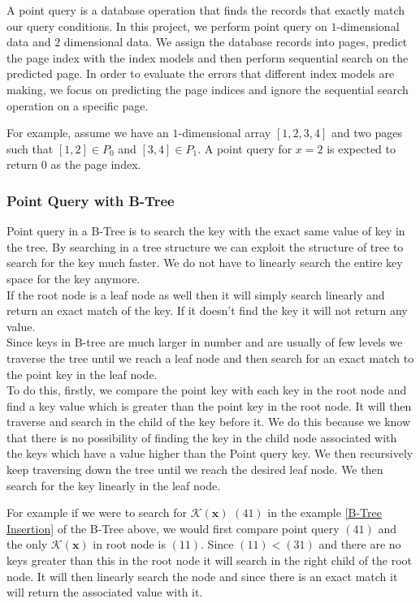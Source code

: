 A point query is a database operation that finds the records that exactly match our query conditions. In this project, we perform point query on $1$-dimensional data and $2$ dimensional data. We assign the database records into pages, predict the page index with the index models and then perform sequential search on the predicted page. In order to evaluate the errors that different index models are making, we focus on predicting the page indices and ignore the sequential search operation on a specific page. 

\begin{mscexample}
For example, assume we have an $1$-dimensional array $[1,2,3,4]$ and two pages such that $[1,2]\in P_0$ and $[3,4]\in P_1$. A point query for $x=2$ is expected to return 0 as the page index.
\end{mscexample}

\subsubsection{Point Query with B-Tree}

Point query in a B-Tree is to search the key with the exact same value of key in the tree. By searching in a tree structure we can exploit the structure of tree to search for the key much faster. We do not have to linearly search the entire key space for the key anymore.\\
If the root node is a leaf node as well then it will simply search linearly and return an exact match of the key. If it doesn't find the key it will not return any value.\\
Since keys in B-tree are much larger in number and are usually of few levels we traverse the tree until we reach a leaf node and then search for an exact match to the point key in the leaf node. \\
To do this, firstly, we compare the point key with each key in the root node and find a key value which is greater than the point key in the root node. It will then traverse and search in the child of the key before it. We do this because we know that there is no possibility of finding the key in the child node associated with the keys which have a value higher than the Point query key. We then recursively keep traversing down the tree until we reach the desired leaf node. We then search for the key linearly in the leaf node.

\begin{mscexample}
For example if we were to search for $\mathcal{K}(\boldsymbol{x})$ $(41)$ in the example \ref{B-Tree Insertion} of the B-Tree above, we would first compare point query $(41)$ and the only $\mathcal{K}(\boldsymbol{x})$ in root node is $(11)$. Since $(11) < (31)$ and there are no keys greater than this in the root node it will search in the right child of the root node. It will then linearly search the node and since there is an exact match it will return the associated value with it.
\end{mscexample}

